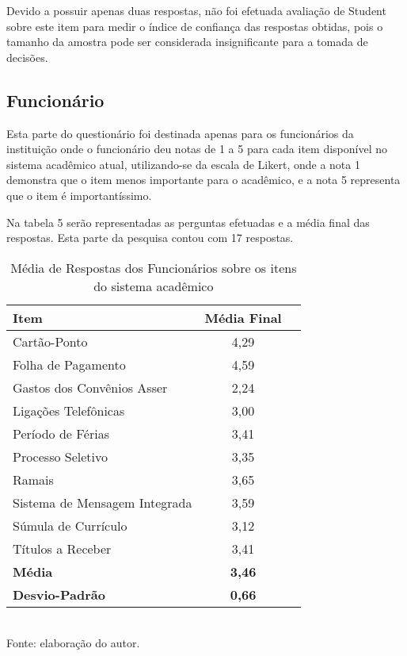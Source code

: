 Devido a possuir apenas duas respostas, não foi efetuada avaliação de Student sobre este item para medir o índice de confiança das respostas obtidas, pois o tamanho da amostra pode ser considerada insignificante para a tomada de decisões.


\subsection{Funcionário}
Esta parte do questionário foi destinada apenas para os funcionários da instituição onde o funcionário deu notas de 1 a 5 para cada item disponível no sistema acadêmico atual, utilizando-se da escala de Likert, onde  a nota 1 demonstra que o item menos importante para o acadêmico, e a nota 5 representa que o item é importantíssimo.

Na tabela 5 serão representadas as perguntas efetuadas e a média final das respostas. Esta parte da pesquisa contou com 17 respostas.

\begin{table}[!hbt]
\centering
\caption[Média de Respostas dos Funcionários]{Média de Respostas dos Funcionários sobre os itens do sistema acadêmico}
\vspace{3mm}
\begin{tabular}{|p{9.5cm}|c|c|}\hline
\textbf{Item} & \textbf{Média Final} \\ \hline
Cartão-Ponto & 4,29 \\ \hline
Folha de Pagamento & 4,59 \\ \hline
Gastos dos Convênios Asser & 2,24 \\ \hline
Ligações Telefônicas & 3,00 \\ \hline
Período de Férias & 3,41 \\ \hline
Processo Seletivo & 3,35 \\ \hline
Ramais & 3,65 \\ \hline
Sistema de Mensagem Integrada & 3,59 \\ \hline
Súmula de Currículo & 3,12 \\ \hline
Títulos a Receber & 3,41 \\ \hline
\textbf{Média} & \textbf{3,46} \\ \hline
\textbf{Desvio-Padrão} & \textbf{0,66} \\ \hline
\end{tabular}
\\ Fonte: elaboração do autor.
\end{table}


